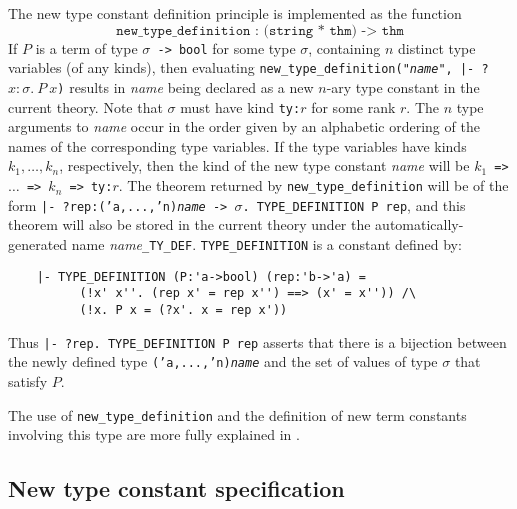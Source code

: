%
The new type constant definition principle is implemented as 
the \ML{} function
\[\texttt{new\_type\_definition~:~(string * thm)~->~thm}\]
If $P$ is a term of type \texttt{$\sigma$ -> bool}
for some type $\sigma$,
containing $n$ distinct
type variables (of any kinds), then evaluating
\texttt{new\_type\_definition("\mbox{\it name}",~|- ?$x{:}\sigma.\ P\ x$)}
results in {\it name\/} being declared as a new $n$-ary type constant
in the current theory.
Note that $\sigma$ must
have
kind \texttt{ty:$r$} for some rank $r$.
The $n$ type arguments to {\it name\/} occur in the order given by an
alphabetic ordering of the names of the corresponding type variables.
If the type variables have kinds $k_1, \ldots, k_n$, respectively,
then the kind of the new type constant {\it name\/} will be
\texttt{$k_1$ => $\ldots$ => $k_n$ => ty:$r$}.
The theorem returned by \texttt{new\_type\_definition} will be of the form
\texttt{|- ?rep:('a,...,'n){\it name} -> $\sigma$.\ TYPE\_DEFINITION P rep},
and this theorem will also be stored in the current theory
under the automatically-generated name {\it name}\texttt{\_TY\_DEF}.
\texttt{TYPE\_DEFINITION} is a constant defined by:
\begin{verbatim}
    |- TYPE_DEFINITION (P:'a->bool) (rep:'b->'a) =
          (!x' x''. (rep x' = rep x'') ==> (x' = x'')) /\
          (!x. P x = (?x'. x = rep x'))
\end{verbatim}
%
Thus \texttt{|-~?rep.~TYPE\_DEFINITION~P~rep} asserts that there is a
bijection between the newly defined type \texttt{('a,...,'n){\it name}}
and the set of values of type $\sigma$ that satisfy $P$.

The use of \texttt{new\_type\_definition} and the definition of new term
constants involving this type are more fully explained in \DESCRIPTION.

\subsection{New type constant specification}

